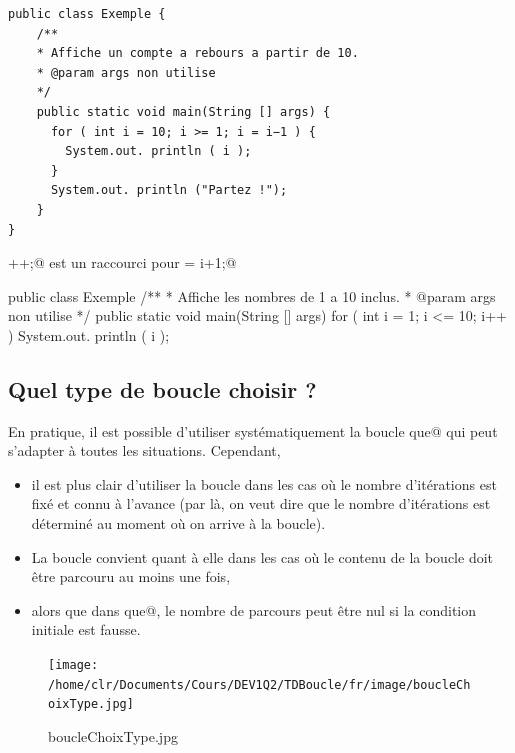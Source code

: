 \documentclass[11pt,a4paper]{article}
\begin{document}
            \par
        \begin{verbatim}
public class Exemple {
    /**
    * Affiche un compte a rebours a partir de 10.
    * @param args non utilise
    */
    public static void main(String [] args) {
      for ( int i = 10; i >= 1; i = i−1 ) {
        System.out. println ( i );
      }
      System.out. println ("Partez !");
    }
}\end{verbatim}\verb@i++;@ est un raccourci pour \verb@i = i+1;@
            \par
        \begin{Java}
public class Exemple {
    /**
    * Affiche les nombres de 1 a 10 inclus.
    * @param args non utilise
    */
    public static void main(String [] args) {
      for ( int i = 1; i <= 10; i++ ) {
        System.out. println ( i );
      }
    }
}\end{Java}\subsection{Quel type de boucle choisir ?}
		    En pratique, il est possible d'utiliser syst\'ematiquement la boucle 
		    \verb@tant que@ qui peut s'adapter
        \`a toutes les situations. Cependant, 
        
					\begin{itemize}
				
			\item 
              il est plus clair d'utiliser la boucle \verb@pour@ 
              dans les cas o\`u le nombre d'it\'erations est fix\'e et connu \`a l'avance
              (par l\`a, on veut dire que le nombre d'it\'erations est d\'etermin\'e au moment o\`u on arrive \`a la boucle). 
            
			\item 
              La boucle \verb@faire@ convient quant \`a elle dans les cas o\`u le contenu de la boucle doit \^etre parcouru au moins une fois,
            
			\item 
              alors que dans \verb@tant que@, le nombre de parcours peut \^etre nul si la condition initiale est fausse.
            
					\end{itemize}
				
            \par
        \begin{figure}[hbt]
				    \begin{center}
					\texttt{[image: /home/clr/Documents/Cours/DEV1Q2/TDBoucle/fr/image/boucleChoixType.jpg]}
						\end{center}
                
                    \caption[boucleChoixType.jpg]{boucleChoixType.jpg}
                \end{figure}
                    
\end{document}
